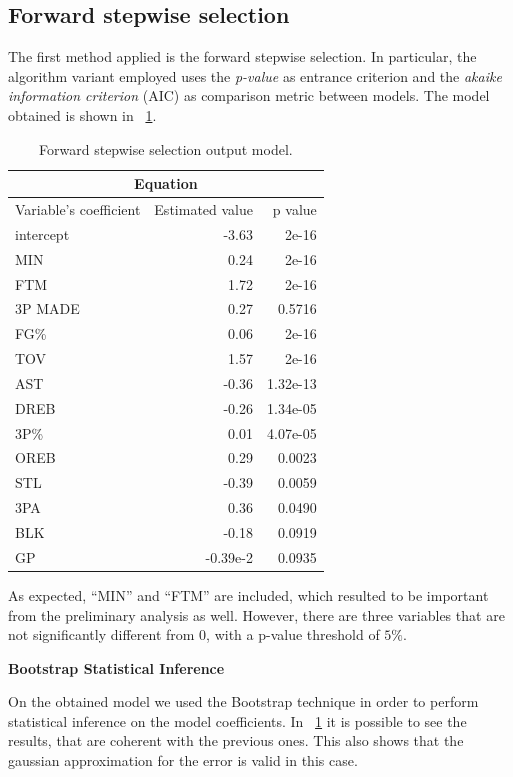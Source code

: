 \subsection{Forward stepwise selection}

The first method applied is the forward stepwise selection. In particular, the algorithm variant employed uses the \textit{p-value} as entrance criterion and the \textit{akaike information criterion} (AIC) as comparison metric between models. The model obtained is shown in \Tab~\ref{table:ForwardModelSummary}.

\begin{table}[H]
	\centering
	\begin{tabular}{|| l | r | r ||} 
		\hline
		\multicolumn{3}{|c|}{Equation} \\
		\hline
		Variable's coefficient & Estimated value & p value \\
		\hline
		intercept & -3.63 & 2e-16 \\
		MIN & 0.24 & 2e-16 \\
		FTM & 1.72 & 2e-16 \\
		3P MADE & 0.27 & 0.5716 \\
		FG\% & 0.06 & 2e-16 \\
		TOV & 1.57 & 2e-16 \\
		AST & -0.36 & 1.32e-13 \\
		DREB & -0.26 & 1.34e-05 \\
		3P\% & 0.01 & 4.07e-05 \\
		OREB & 0.29 & 0.0023 \\
		STL & -0.39 & 0.0059 \\
		3PA & 0.36 & 0.0490 \\
		BLK & -0.18 & 0.0919 \\
		GP & -0.39e-2 & 0.0935 \\
		\hline
	\end{tabular}
	\caption{Forward stepwise selection output model.}
	\label{table:ForwardModelSummary}
\end{table}

As expected, ``MIN'' and ``FTM'' are included, which resulted to be important from the preliminary analysis as well. However, there are three variables that are not significantly different from 0, with a p-value threshold of $5\%$.

\textbf{Bootstrap Statistical Inference}

On the obtained model we used the Bootstrap technique in order to perform statistical inference on the model coefficients. In \Tab~\ref{table:ForwardModelSummary} it is possible to see the results, that are coherent with the previous ones. This also shows that the gaussian approximation for the error is valid in this case. 

